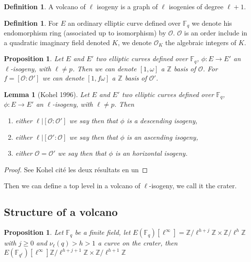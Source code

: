 \documentclass{article}
\theoremstyle{plain}
\newtheorem{lem}[thm]{Lemma}
\newtheorem{prop}[thm]{Proposition}
\theoremstyle{definition}
\newtheorem{defi}[thm]{Definition}
\theoremstyle{remark}
\begin{document}
\begin{defi}
A volcano of $\ell$ isogeny is a graph of $\ell$ isogenies of degree $\ell+1$.
\end{defi}

\begin{defi}
For $E$ an ordinary elliptic curve defined over $\mathbb{F}_q$ we denote  his endomorphism ring (associated up to isomorphism) by $\mathcal{O}$. $\mathcal{O}$ is an order include in a quadratic imaginary field denoted $K$, we denote $\mathcal{O}_K$ the algebraic integers of $K$.
\end{defi}

\begin{prop}
Let $E$ and $E'$ two elliptic curves defined over $\mathbb{F}_q$, $\phi :E \rightarrow E'$ an $\ell$-isogeny, with $\ell \neq p$. Then we can denote $[1,\omega]$ a $\mathbb{Z}$ basis of $\mathcal{O}$. For $f=[\mathcal{O} : \mathcal{O}']$ we can denote $[1,f\omega]$ a $\mathbb{Z}$ basis of $\mathcal{O'}$.
\end{prop}

\begin{lem}[Kohel 1996]
Let $E$ and $E'$ two elliptic curves defined over $\mathbb{F}_q$, $\phi :E \rightarrow E'$ an $\ell$-isogeny, with $\ell \neq p$. Then
\begin{enumerate}
\item either $\ell|[\mathcal{O} : \mathcal{O}']$ we say then that $\phi$ is a descending isogeny,
\item either $\ell|[\mathcal{O}':\mathcal{O}]$ we say then that $\phi$ is an ascending isogeny,
\item either $\mathcal{O}=\mathcal{O}'$ we say then that $\phi$ is an horizontal isogeny.
\end{enumerate}
\end{lem}

\begin{proof}
See Kohel cité les deux résultats en un
\end{proof}

Then we can define a top level in a volcano of $\ell$-isogeny, we call it the crater.


\subsection{Structure of a volcano}

\begin{prop} \label{structelevation}
Let $\mathbb{F}_q$ be a finite field, let $E(\mathbb{F}_q)[\ell^{\infty}]=\mathbb{Z}/\ell^{h+j}\mathbb{Z} \times \mathbb{Z}/\ell^{h}\mathbb{Z}$ with $ j \geqslant 0$ and $\nu_\ell(q)>h>1$ a curve on the crater, then $E(\mathbb{F}_{q^\ell})[\ell^{\infty}]  \mathbb{Z}/\ell^{h+j+1}\mathbb{Z} \times \mathbb{Z}/\ell^{h+1}\mathbb{Z}$
\end{prop}
\end{document}
